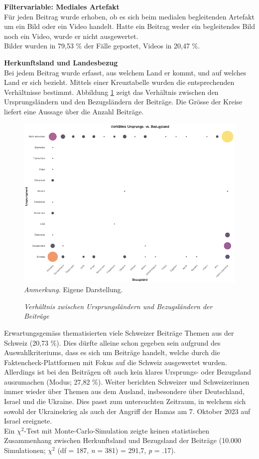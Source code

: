 \documentclass[12pt,a4paper]{article}        %
\begin{document}
\textbf{Filtervariable: Mediales Artefakt}\\
Für jeden Beitrag wurde erhoben, ob es sich beim medialen begleitenden Artefakt um ein Bild oder ein Video handelt. Hatte ein Beitrag weder ein begleitendes Bild noch ein Video, wurde er nicht ausgewertet. \\
Bilder wurden in 79,53 \% der Fälle gepostet, Videos in 20,47 \%.

\textbf{Herkunftsland und Landesbezug}\\
Bei jedem Beitrag wurde erfasst, aus welchem Land er kommt, und auf welches Land er sich bezieht. Mittels einer Kreuztabelle wurden die entsprechenden Verhältnisse bestimmt. Abbildung \ref{fig:results_country_relation} zeigt das Verhältnis zwischen den Ursprungsländern und den Bezugsländern der Beiträge. Die Grösse der Kreise liefert eine Aussage über die Anzahl Beiträge.
\begin{figure}[H]
  \caption{\textit{Verhältnis zwischen Ursprungsländern und Bezugsländern der Beiträge}}
  \label{fig:results_country_relation}
  \centering
  \includegraphics[width=1\linewidth]{images/country_relation_plot.png}
  \footnotesize\textit{Anmerkung.} Eigene Darstellung.
\end{figure}

Erwartungsgemäss thematisierten viele Schweizer Beiträge Themen aus der Schweiz (20,73 \%). Dies dürfte alleine schon gegeben sein aufgrund des Auswahlkriteriums, dass es sich um Beiträge handelt, welche durch die Faktencheck-Plattformen mit Fokus auf die Schweiz ausgewertet wurden. Allerdings ist bei den Beiträgen oft auch kein klares Ursprungs- oder Bezugsland auszumachen (Modus; 27,82 \%). Weiter berichten Schweizer und Schweizerinnen immer wieder über Themen aus dem Ausland, insbesondere über Deutschland, Israel und die Ukraine. Dies passt zum untersuchten Zeitraum, in welchem sich sowohl der Ukrainekrieg als auch der Angriff der Hamas am 7. Oktober 2023 auf Israel ereignete.\\
Ein \(\chi^2\)-Test mit Monte-Carlo-Simulation zeigte keinen statistischen Zusammenhang zwischen Herkunftsland und Bezugsland der Beiträge (10.000 Simulationen; \(\chi^2\) (df = 187, \textit{n} = 381) = 291,7,  \textit{p} = .17).
\end{document}
